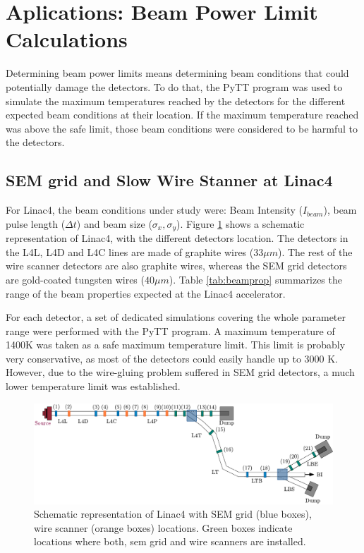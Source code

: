\section{Aplications: Beam Power Limit Calculations}

Determining beam power limits means determining beam conditions that could potentially damage the detectors. To do that, the PyTT program was used to simulate the maximum temperatures reached by the detectors for the different expected beam conditions at their location. If the maximum temperature reached was above the safe limit, those beam conditions were considered to be harmful to the detectors. 

\subsection{SEM grid and Slow Wire Stanner at Linac4}

For Linac4, the beam conditions under study were: Beam Intensity ($I_{beam}$), beam pulse length ($\Delta t$) and beam size ($\sigma_x , \sigma_y$). Figure \ref{fig:DetLoc} shows a schematic representation of Linac4, with the different detectors location. The detectors in the L4L, L4D and L4C lines are made of graphite wires ($33 \mu m$). The rest of the wire scanner detectors are also graphite wires, whereas the SEM grid detectors are gold-coated tungsten wires ($40 \mu m$). Table \ref{tab:beamprop} summarizes the range of the beam properties expected at the Linac4 accelerator.

For each detector, a set of dedicated simulations covering the whole parameter range were performed with the PyTT program. A maximum temperature of 1400K was taken as a safe maximum temperature limit. This limit is probably very conservative, as most of the detectors could easily handle up to 3000 K. However, due to the wire-gluing problem suffered in SEM grid detectors, a much lower temperature limit was established. 

\begin{figure}[h]
    \centering
    \includegraphics[width=1.0\columnwidth]{Figure_Linac4Instrumetnation/DetecPos.pdf}
    \caption{Schematic representation of Linac4 with SEM grid (blue boxes), wire scanner (orange boxes) locations. Green boxes indicate locations where both, sem grid and wire scanners are installed.}
    \label{fig:DetLoc}
\end{figure}


